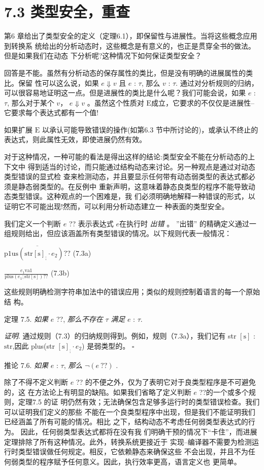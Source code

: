 \section{7.3 类型安全，重查}

第6 章给出了类型安全的定义（定理6.1），即保留性与进展性。当将这些概念应用到转换系
统给出的分析动态时，这些概念是有意义的，也正是贯穿全书的做法。但是如果我们在动态
下分析呢?这种情况下如何保证类型安全？

回答是不能。虽然有分析动态的保存属性的类比，但是没有明确的进展属性的类比。保留
性可以这么说，如果 $e \Downarrow v$ 且 $e$ : $\tau$, 那么 $v$ : $\tau$. 通过对分析规则的归纳，可以很容易地证明这一点。但是进展性的类比是什么呢？我们可能会说，如果 $e$ : $\tau$, 那么对于某个 $v$， $e\Downarrow v$ 。虽然这个性质对 $\mathrm{E}$成立，它要求的不仅仅是进展性--它要求每个表达式都有一个值!

如果扩展 $\mathrm{E}$ 以承认可能导致错误的操作(如第6.3 节中所讨论的)，或承认不终止的表达式，则此属性无效，即使进展仍然有效。

对于这种情况，一种可能的看法是得出这样的结论:类型安全不能在分析动态的上下文中
得到适当的讨论，而只能通过结构动态来讨论。另一种观点是通过对动态类型错误的显式检
查来检测动态，并且要显示任何带有动态弱类型的表达式都必须是静态弱类型的。在反例中
重新声明，这意味着静态良类型的程序不能导致动态类型错误。这种观点的一个困难是，我
们必须明确地解释一种错误的形式，以证明它不可能出现!然而，可以利用分析动态建立一
种表面的类型安全。

我们定义一个判断 $e$ ?? 表示表达式 $e$在执行时 {\it 出错} 。 ''出错''%
的精确定义通过一组规则给出，但应该涵盖所有类型错误的情况。以下规则代表一般情况：%
\begin{center}
$\overline{\mathrm{p}1\mathrm{u}\mathrm{s}(\mathrm{s}\mathrm{t}\mathrm{r}[\mathrm{s}]_{;}\cdot e_{2})??}$   (7.3a)

$\displaystyle \frac{e_{1}\mathrm{v}\mathrm{a}1}{\mathrm{p}\mathrm{l}\mathrm{u}\mathrm{s}(e_{1};\mathrm{s}\mathrm{t}\mathrm{r}[\mathrm{s}])??}$   (7.3b)
\end{center}
这些规则明确检测字符串加法中的错误应用；类似的规则控制着语言的每一个原始结
构。%

定理 7.5. {\it 如果} $e$ ??, {\it 那么不存在} $\tau$ {\it 满足} $e$ : $\tau.$

{\it 证明}. 通过规则（7.3）的归纳规则得到。例如，规则（7.3a），我们记有 str $[\mathrm{s}]$ : $\mathrm{s}\mathrm{t}\mathrm{r}$,因此 plus(str $[\mathrm{s}]_{;}\cdot e_{2}$) 是弱类型的。  $\square $

推论 7.6. {\it 如果} $e$ : $\tau$, {\it 那么} $\neg (e\ ??)$ .

除了不得不定义判断 $e$ ?? 的不便之外，仅为了表明它对于良类型程序是不可避免的，这
在方法论上有明显的缺陷。如果我们省略了定义判断 $e$ ??的一个或多个规则，定理7.5 的证
明仍然有效；无法确保包含足够多运行时的类型错误检查。我们可以证明我们定义的那些
不能在一个良类型程序中出现，但是我们不能证明我们已经涵盖了所有可能的情况。相比
之下，结构动态不考虑任何弱类型表达式的行为。 因此，任何弱类型表达式都将在没有我
们明确干预的情况下“卡住”，而进展定理排除了所有这种情况。此外，转换系统更接近于
实现--编译器不需要为检测运行时类型错误做任何规定。相反，它依赖静态来确保这些
不会出现，并且不为任何弱类型的程序赋予任何意义。因此，执行效率更高，语言定义也
更简单。
